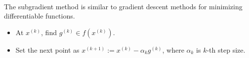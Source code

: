 \\
The subgradient method is similar to gradient descent methods for minimizing differentiable functions.

\begin{itemize}
\item At $x^{(k)}$, find $g^{(k)} \in f(x^{(k)})$.
\item Set the next point as $x^{(k+1)}:=x^{(k)}-\alpha_kg^{(k)}$, where $\alpha_k$ is $k$-th step size.

\end{itemize}

